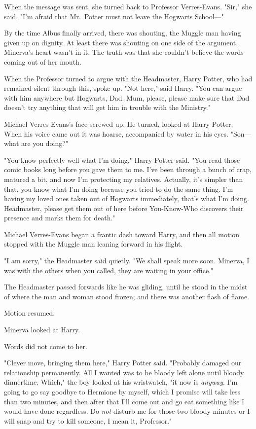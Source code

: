 When the message was sent, she turned back to Professor Verres-Evans. "Sir," 
she said, "I'm afraid that Mr.~Potter must not leave the Hogwarts School---"

By the time Albus finally arrived, there was shouting, the Muggle man having 
given up on dignity. At least there was shouting on one side of the argument. 
Minerva's heart wasn't in it. The truth was that she couldn't believe the words 
coming out of her mouth.

When the Professor turned to argue with the Headmaster, Harry Potter, who had 
remained silent through this, spoke up. "Not here," said Harry. "You can argue 
with him anywhere but Hogwarts, Dad. Mum, please, please make sure that Dad 
doesn't try anything that will get him in trouble with the Ministry."

Michael Verres-Evans's face screwed up. He turned, looked at Harry Potter. When 
his voice came out it was hoarse, accompanied by water in his eyes. "Son---what 
are you doing?"

"You know perfectly well what I'm doing," Harry Potter said. "You read those 
comic books long before you gave them to me. I've been through a bunch of crap, 
matured a bit, and now I'm protecting my relatives. Actually, it's simpler than 
that, you know what I'm doing because you tried to do the same thing. I'm 
having my loved ones taken out of Hogwarts immediately, that's what I'm doing. 
Headmaster, please get them out of here before You-Know-Who discovers their 
presence and marks them for death."

Michael Verres-Evans began a frantic dash toward Harry, and then all motion 
stopped with the Muggle man leaning forward in his flight.

"I am sorry," the Headmaster said quietly. "We shall speak more soon. Minerva, 
I was with the others when you called, they are waiting in your office."

The Headmaster passed forwards like he was gliding, until he stood in the midst 
of where the man and woman stood frozen; and there was another flash of flame.

Motion resumed.

Minerva looked at Harry.

Words did not come to her.

"Clever move, bringing them here," Harry Potter said. "Probably damaged our 
relationship permanently. All I wanted was to be bloody left alone until bloody 
dinnertime. Which," the boy looked at his wristwatch, "it now is \emph{anyway}. 
I'm going to go say goodbye to Hermione by myself, which I promise will take 
less than two minutes, and then after that I'll come out and go eat something 
like I would have done regardless. Do \emph{not} disturb me for those two 
bloody minutes or I will snap and try to kill someone, I mean it, Professor."

